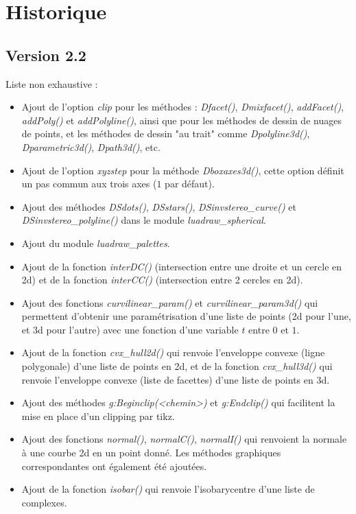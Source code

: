 \section{Historique}

\subsection{Version 2.2}
Liste non exhaustive :
\begin{itemize}
    \item Ajout de l'option \emph{clip} pour les méthodes : \emph{Dfacet()}, \emph{Dmixfacet()}, \emph{addFacet()}, \emph{addPoly()} et \emph{addPolyline()}, ainsi que pour les méthodes de dessin de nuages de points, et les méthodes de dessin "au trait" comme \emph{Dpolyline3d()}, \emph{Dparametric3d()}, \emph{Dpath3d()}, etc.
    \item Ajout de l'option \emph{xyzstep} pour la méthode \emph{Dboxaxes3d()}, cette option définit un pas commun aux trois axes ($1$ par défaut).
    \item Ajout des méthodes \emph{DSdots()}, \emph{DSstars()}, \emph{DSinvstereo\_curve()} et \emph{DSinvstereo\_polyline()} dans le module \emph{luadraw\_spherical}.
    \item Ajout du module \emph{luadraw\_palettes}.
    \item Ajout de la fonction \emph{interDC()} (intersection entre une droite et un cercle en 2d) et de la fonction \emph{interCC()} (intersection entre 2 cercles en 2d).
    \item Ajout des fonctions \emph{curvilinear\_param()} et \emph{curvilinear\_param3d()} qui permettent d'obtenir une paramétrisation d'une liste de points (2d pour l'une, et 3d pour l'autre) avec une fonction d'une variable $t$ entre $0$ et $1$.
    \item Ajout de la fonction \emph{cvx\_hull2d()} qui renvoie l'enveloppe convexe (ligne polygonale) d'une liste de points en 2d, et de la fonction \emph{cvx\_hull3d()} qui renvoie l'enveloppe convexe (liste de facettes) d'une liste de points en 3d.
    \item Ajout des méthodes \emph{g:Beginclip(<chemin>)} et \emph{g:Endclip()} qui facilitent la mise en place d'un clipping par tikz.
    \item Ajout des fonctions \emph{normal()}, \emph{normalC()}, \emph{normalI()} qui renvoient la normale à une courbe 2d en un point donné. Les méthodes graphiques correspondantes ont également été ajoutées.
    \item Ajout de la fonction \emph{isobar()} qui renvoie l'isobarycentre d'une liste de complexes.

\end{itemize}
